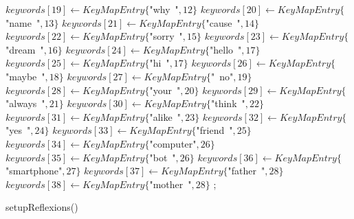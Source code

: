 \documentclass[a4paper,10pt]{article}
\begin{document}
\begin{function}
{  \(keywords[19]\leftarrow{}KeyMapEntry\{\)"{}why\ "{}\(,12\}\)\;
  \(keywords[20]\leftarrow{}KeyMapEntry\{\)"{}name\ "{}\(,13\}\)\;
  \(keywords[21]\leftarrow{}KeyMapEntry\{\)"{}cause\ "{}\(,14\}\)\;
  \(keywords[22]\leftarrow{}KeyMapEntry\{\)"{}sorry\ "{}\(,15\}\)\;
  \(keywords[23]\leftarrow{}KeyMapEntry\{\)"{}dream\ "{}\(,16\}\)\;
  \(keywords[24]\leftarrow{}KeyMapEntry\{\)"{}hello\ "{}\(,17\}\)\;
  \(keywords[25]\leftarrow{}KeyMapEntry\{\)"{}hi\ "{}\(,17\}\)\;
  \(keywords[26]\leftarrow{}KeyMapEntry\{\)"{}maybe\ "{}\(,18\}\)\;
  \(keywords[27]\leftarrow{}KeyMapEntry\{\)"{}\ no"{}\(,19\}\)\;
  \(keywords[28]\leftarrow{}KeyMapEntry\{\)"{}your\ "{}\(,20\}\)\;
  \(keywords[29]\leftarrow{}KeyMapEntry\{\)"{}always\ "{}\(,21\}\)\;
  \(keywords[30]\leftarrow{}KeyMapEntry\{\)"{}think\ "{}\(,22\}\)\;
  \(keywords[31]\leftarrow{}KeyMapEntry\{\)"{}alike\ "{}\(,23\}\)\;
  \(keywords[32]\leftarrow{}KeyMapEntry\{\)"{}yes\ "{}\(,24\}\)\;
  \(keywords[33]\leftarrow{}KeyMapEntry\{\)"{}friend\ "{}\(,25\}\)\;
  \(keywords[34]\leftarrow{}KeyMapEntry\{\)"{}computer"{}\(,26\}\)\;
  \(keywords[35]\leftarrow{}KeyMapEntry\{\)"{}bot\ "{}\(,26\}\)\;
  \(keywords[36]\leftarrow{}KeyMapEntry\{\)"{}smartphone"{}\(,27\}\)\;
  \(keywords[37]\leftarrow{}KeyMapEntry\{\)"{}father\ "{}\(,28\}\)\;
  \(keywords[38]\leftarrow{}KeyMapEntry\{\)"{}mother\ "{}\(,28\}\)\;
  ;
}
\end{function}


\begin{function}
\caption{setupReflexions()}
\end{function}
\end{document}
